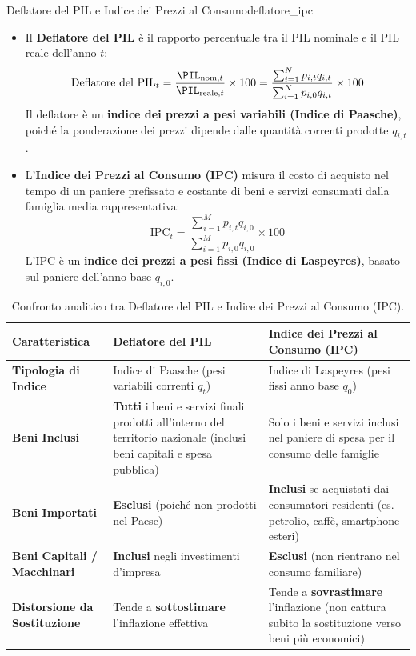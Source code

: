 \begin{definizione}{Deflatore del PIL e Indice dei Prezzi al Consumo}{deflatore_ipc}
\begin{itemize}
    \item Il \textbf{Deflatore del PIL} è il rapporto percentuale tra il PIL nominale e il PIL reale dell'anno $t$:
    \begin{equation}
        \text{Deflatore del PIL}_t = \frac{\PIL_{\text{nom}, t}}{\PIL_{\text{reale}, t}} \times 100 = \frac{\sum_{i=1}^N p_{i, t} q_{i, t}}{\sum_{i=1}^N p_{i, 0} q_{i, t}} \times 100
    \end{equation}
    Il deflatore è un \textbf{indice dei prezzi a pesi variabili (Indice di Paasche)}, poiché la ponderazione dei prezzi dipende dalle quantità correnti prodotte $q_{i, t}$.
    
    \item L'\textbf{Indice dei Prezzi al Consumo (IPC)} misura il costo di acquisto nel tempo di un paniere prefissato e costante di beni e servizi consumati dalla famiglia media rappresentativa:
    \begin{equation}
        \text{IPC}_t = \frac{\sum_{i=1}^M p_{i, t} q_{i, 0}}{\sum_{i=1}^M p_{i, 0} q_{i, 0}} \times 100
    \end{equation}
    L'IPC è un \textbf{indice dei prezzi a pesi fissi (Indice di Laspeyres)}, basato sul paniere dell'anno base $q_{i, 0}$.
\end{itemize}
\end{definizione}

\begin{table}[htbp]
\centering
\small
\renewcommand{\arraystretch}{1.3}
\begin{tabularx}{\textwidth}{l X X}
\toprule
\textbf{Caratteristica} & \textbf{Deflatore del PIL} & \textbf{Indice dei Prezzi al Consumo (IPC)} \\
\midrule
\textbf{Tipologia di Indice} & Indice di Paasche (pesi variabili correnti $q_t$) & Indice di Laspeyres (pesi fissi anno base $q_0$) \\
\textbf{Beni Inclusi} & \textbf{Tutti} i beni e servizi finali prodotti all'interno del territorio nazionale (inclusi beni capitali e spesa pubblica) & Solo i beni e servizi inclusi nel paniere di spesa per il consumo delle famiglie \\
\textbf{Beni Importati} & \textbf{Esclusi} (poiché non prodotti nel Paese) & \textbf{Inclusi} se acquistati dai consumatori residenti (es. petrolio, caffè, smartphone esteri) \\
\textbf{Beni Capitali / Macchinari} & \textbf{Inclusi} negli investimenti d'impresa & \textbf{Esclusi} (non rientrano nel consumo familiare) \\
\textbf{Distorsione da Sostituzione} & Tende a \textbf{sottostimare} l'inflazione effettiva & Tende a \textbf{sovrastimare} l'inflazione (non cattura subito la sostituzione verso beni più economici) \\
\bottomrule
\end{tabularx}
\caption{Confronto analitico tra Deflatore del PIL e Indice dei Prezzi al Consumo (IPC).}
\label{tab:deflatore_vs_ipc}
\end{table}

